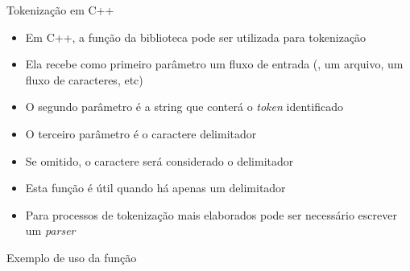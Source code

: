 \begin{frame}[fragile]{Tokenização em C++}

    \begin{itemize}
        \item Em C++, a função  da biblioteca  pode ser 
            utilizada para tokenização
        \pause

        \item Ela recebe como primeiro parâmetro um fluxo de entrada (, um arquivo, 
            um fluxo de caracteres, etc)
        \pause

        \item O segundo parâmetro é a string que conterá o \textit{token} identificado 
        \pause

        \item O terceiro parâmetro é o caractere delimitador
        \pause

        \item Se omitido, o caractere  será considerado o delimitador
        \pause

        \item Esta função é útil quando há apenas um delimitador
        \pause

        \item Para processos de tokenização mais elaborados pode ser necessário escrever um \textit{parser}

    \end{itemize}

\end{frame}

\begin{frame}[fragile]{Exemplo de uso da função }
\end{frame}
